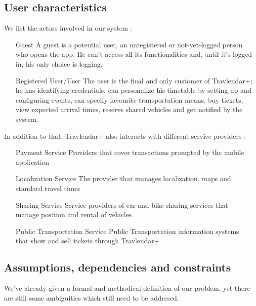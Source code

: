 			
	\subsection{User characteristics}

	We list the actors involved in our system :
	
	\begin{enumerate}
	
		\item[Guest] A guest is a potential user, an unregistered or not-yet-logged person who opens the app. He can't access all its functionalities and, until it's logged in, his only choice is logging.
		
		\item[Registered User/User] The user is the final and only customer of Travlendar+; he has identifying credentials, can personalize his timetable by setting up and configuring events, can specify favourite transportation means, buy tickets, view expected arrival times, reserve shared vehicles and get notified by the system.

	\end{enumerate}
	
In addition to that, Travlendar+ also interacts with different service providers :
	
	\begin{enumerate}
	
		
		\item[Payment Service] Providers that cover transactions prompted by the mobile application
		\item[Localization Service] The provider that manages localization, maps and standard travel times 
		\item[Sharing Service] Service providers of car and bike sharing services that manage position and rental of vehicles
		\item[Public Transportation Service] Public Transportation information systems that show and sell tickets through Travlendar+
	
	\end{enumerate}

		
\subsection{Assumptions, dependencies and constraints}

We've already given a formal and methodical definition of our problem, yet there are still some ambiguities which still need to be addresed.


